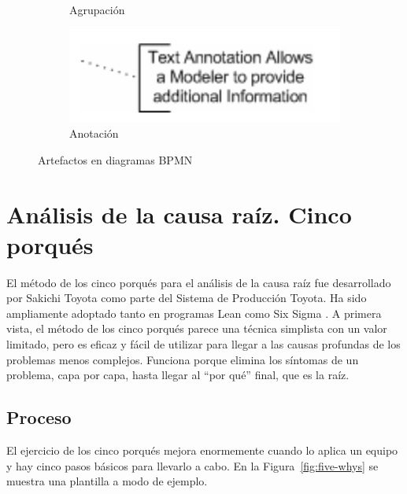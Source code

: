 \begin{figure}[H]
\begin{subfigure}[b]{0.3\textwidth}
        \caption{Agrupación}
    \end{subfigure}
    \hfill
    \begin{subfigure}[b]{0.4\textwidth}
        \centering
        \includegraphics[width=\textwidth]{img/bpmn-note.png}
        \caption{Anotación}
    \end{subfigure}
    \caption{Artefactos en diagramas BPMN}
    \label{fig:bpmn-artifacts}
\end{figure}


\section{Análisis de la causa raíz. Cinco porqués}

El método de los cinco porqués para el análisis de la causa raíz fue desarrollado por Sakichi Toyota como parte del Sistema de Producción Toyota.
Ha sido ampliamente adoptado tanto en programas Lean como Six Sigma \cite{tarantino_smart_2022}.
A primera vista, el método de los cinco porqués parece una técnica simplista con un valor limitado, pero es eficaz y fácil de utilizar para llegar a las causas profundas de los problemas menos complejos.
Funciona porque elimina los síntomas de un problema, capa por capa, hasta llegar al ``por qué'' final, que es la raíz.

\subsection{Proceso}

El ejercicio de los cinco porqués mejora enormemente cuando lo aplica un equipo y hay cinco pasos básicos para llevarlo a cabo. En la Figura~\ref{fig:five-whys} se muestra una plantilla a modo de ejemplo.

